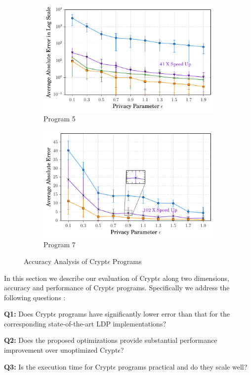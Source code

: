 \begin{figure}[ht]
\begin{subfigure}[b]{0.25\linewidth}
    \centering    \includegraphics[width=1\linewidth]{5_final.pdf}
        \caption{Program 5}
        \label{fig:P5}\end{subfigure}%
      \begin{subfigure}[b]{0.25\linewidth}
    \centering    \includegraphics[width=1\linewidth]{7_final.pdf}
        \caption{Program 7}
        \label{fig:P7}
    \end{subfigure}
   \caption{Accuracy Analysis of Crypt$\epsilon$ Programs}
   \label{accuracy}
\end{figure}
In this section we describe our evaluation of Crypt$\epsilon$ along two dimensions, accuracy and  performance of Crypt$\epsilon$ programs. Specifically we address the following questions : \squishlist \item \textbf{Q1:} Does Crypt$\epsilon$ programs have significantly lower error than that for the corresponding state-of-the-art \textsf{LDP} implementations?\item \textbf{Q2:} Does the proposed optimizations provide substantial performance improvement over unoptimized Crypt$\epsilon$? \item \textbf{Q3:} Is the execution time for Crypt$\epsilon$ programs practical and do they scale well? \squishend
